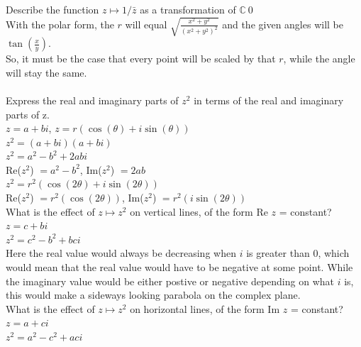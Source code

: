 \documentclass[12pt]{article}
\begin{document}
 Describe the function $z \mapsto 1/\bar{z}$ as a transformation of $\mathbb{C} \ {0} $\\

With the polar form, the $r$ will equal $\sqrt{\frac{x^2+y^2}{(x^2+y^2)^2}}$ and the given angles will be $\tan(\frac{x}{y})$.\\
So, it must be the case that every point will be scaled by that $r$, while the angle will stay the same.\\


\\

 Express the real and imaginary parts of $z^2$ in terms of the real and imaginary parts of z.\\

$z = a + bi$, $z = r(\cos(\theta) + i\sin(\theta))$\\

$z^2 = (a + bi)(a + bi)$\\
$z^2 = a^2 - b^2 + 2abi$\\
Re($z^2$) $ = a^2 - b^2$, Im($z^2$) $ = 2ab$\\

$z^2 = r^2(\cos(2\theta) + i\sin(2\theta))$\\
Re($z^2$) $ = r^2(\cos(2\theta))$, Im($z^2$) $ = r^2(i\sin(2\theta))$\\



 What is the effect of $z \mapsto z^2$ on vertical lines, of the form Re $z$ = constant?\\

$z = c + bi$\\
$z^2 = c^2 - b^2 + bci$\\

Here the real value would always be decreasing when $i$ is greater than 0, which would mean that the real value would have to be negative at some point.
While the imaginary value would be either postive or negative depending on what $i$ is, this would make a sideways looking parabola on the complex plane.\\


 What is the effect of $z \mapsto z^2$ on horizontal lines, of the form Im $z$ = constant?\\

$z = a + ci$\\
$z^2 = a^2 - c^2 + aci$\\
\end{document}
